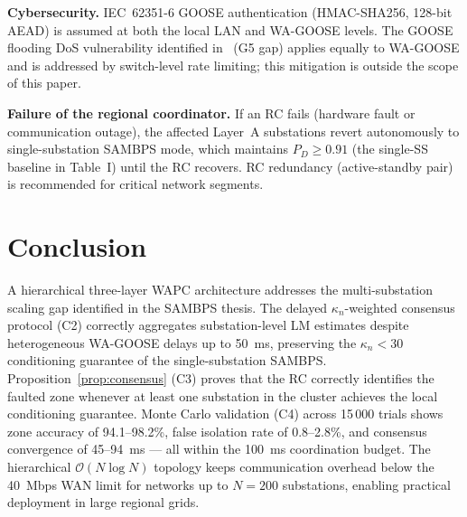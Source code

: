 \documentclass[journal]{IEEEtran}
\newcommand{\kappan}{\kappa_n}
\begin{document}
\textbf{Cybersecurity.}
IEC~62351-6 GOOSE authentication (HMAC-SHA256, 128-bit AEAD) is assumed
at both the local LAN and WA-GOOSE levels.  The GOOSE flooding DoS
vulnerability identified in~\cite{SAMBP_TR65} (G5 gap) applies equally
to WA-GOOSE and is addressed by switch-level rate limiting; this
mitigation is outside the scope of this paper.

\textbf{Failure of the regional coordinator.}
If an RC fails (hardware fault or communication outage), the affected
Layer~A substations revert autonomously to single-substation SAMBPS mode,
which maintains $P_D \geq 0.91$ (the single-SS baseline in Table~I) until
the RC recovers.  RC redundancy (active-standby pair) is recommended for
critical network segments.

\section{Conclusion}
\label{sec:conclusion}

A hierarchical three-layer WAPC architecture addresses the multi-substation
scaling gap identified in the SAMBPS thesis.  The delayed
$\kappan$-weighted consensus protocol (C2) correctly aggregates
substation-level LM estimates despite heterogeneous WA-GOOSE delays up
to 50~ms, preserving the $\kappan < 30$ conditioning guarantee of the
single-substation SAMBPS.  Proposition~\ref{prop:consensus} (C3) proves
that the RC correctly identifies the faulted zone whenever at least one
substation in the cluster achieves the local conditioning guarantee.
Monte Carlo validation (C4) across 15\,000 trials shows zone accuracy
of 94.1--98.2\%, false isolation rate of 0.8--2.8\%, and consensus
convergence of 45--94~ms — all within the 100~ms coordination budget.
The hierarchical $\mathcal{O}(N\log N)$ topology keeps communication
overhead below the 40~Mbps WAN limit for networks up to $N = 200$
substations, enabling practical deployment in large regional grids.



\end{document}
